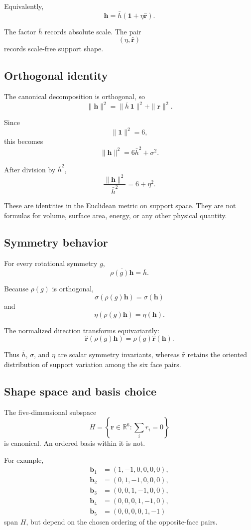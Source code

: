 Equivalently,
\[
\mathbf h
=
\bar h
\left(
\mathbf 1+\eta\widehat{\mathbf r}
\right).
\]

The factor \(\bar h\) records absolute scale. The pair
\[
(\eta,\widehat{\mathbf r})
\]
records scale-free support shape.

\subsection{Orthogonal identity}

The canonical decomposition is orthogonal, so
\[
\|\mathbf h\|^2
=
\|\bar h\,\mathbf 1\|^2+\|\mathbf r\|^2.
\]

Since
\[
\|\mathbf 1\|^2=6,
\]
this becomes
\[
\|\mathbf h\|^2
=
6\bar h^2+\sigma^2.
\]

After division by \(\bar h^2\),
\[
\frac{\|\mathbf h\|^2}{\bar h^2}
=
6+\eta^2.
\]

These are identities in the Euclidean metric on support space. They are not
formulas for volume, surface area, energy, or any other physical quantity.

\subsection{Symmetry behavior}

For every rotational symmetry \(g\),
\[
\overline{\rho(g)\mathbf h}
=
\bar h.
\]

Because \(\rho(g)\) is orthogonal,
\[
\sigma(\rho(g)\mathbf h)
=
\sigma(\mathbf h)
\]
and
\[
\eta(\rho(g)\mathbf h)
=
\eta(\mathbf h).
\]

The normalized direction transforms equivariantly:
\[
\widehat{\mathbf r}(\rho(g)\mathbf h)
=
\rho(g)\widehat{\mathbf r}(\mathbf h).
\]

Thus \(\bar h\), \(\sigma\), and \(\eta\) are scalar symmetry invariants,
whereas \(\widehat{\mathbf r}\) retains the oriented distribution of support
variation among the six face pairs.

\subsection{Shape space and basis choice}

The five-dimensional subspace
\[
H
=
\left\{
\mathbf r\in\mathbb R^6:
\sum_i r_i=0
\right\}
\]
is canonical. An ordered basis within it is not.

For example,
\[
\begin{aligned}
\mathbf b_1&=(1,-1,0,0,0,0),\\
\mathbf b_2&=(0,1,-1,0,0,0),\\
\mathbf b_3&=(0,0,1,-1,0,0),\\
\mathbf b_4&=(0,0,0,1,-1,0),\\
\mathbf b_5&=(0,0,0,0,1,-1)
\end{aligned}
\]
span \(H\), but depend on the chosen ordering of the opposite-face pairs.

